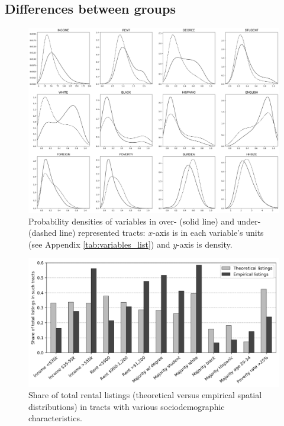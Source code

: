 \documentclass[11pt,onecolumn]{article} %
\begin{document}
\subsection{Differences between groups}

\begin{figure}[tbp]
	\centering
	\includegraphics[width=1\textwidth]{fig_variable_distributions.png}
	\caption{Probability densities of variables in over- (solid line) and under- (dashed line) represented tracts: $x$-axis is in each variable's units (see Appendix \ref{tab:variables_list}) and $y$-axis is density.}
	\label{fig:variable_distributions}
\end{figure}

\begin{figure}[tbp]
	\centering
	\includegraphics[width=1\textwidth]{fig_tract_shares.png}
	\caption{Share of total rental listings (theoretical versus empirical spatial distributions) in tracts with various sociodemographic characteristics.}
	\label{fig:tract_shares}
\end{figure}
\end{document}
